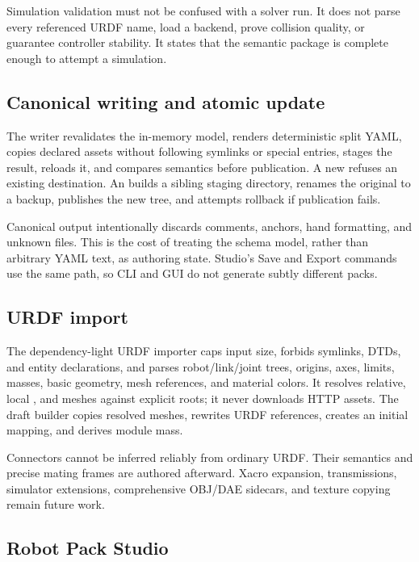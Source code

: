 Simulation validation must not be confused with a solver run. It does not parse every
referenced URDF name, load a backend, prove collision quality, or guarantee controller
stability. It states that the semantic package is complete enough to attempt a
simulation.

\subsection{Canonical writing and atomic update}

The writer revalidates the in-memory model, renders deterministic split YAML, copies
declared assets without following symlinks or special entries, stages the result,
reloads it, and compares semantics before publication. A new  refuses an
existing destination. An  builds a sibling staging directory, renames the
original to a backup, publishes the new tree, and attempts rollback if publication
fails.

Canonical output intentionally discards comments, anchors, hand formatting, and unknown
files. This is the cost of treating the schema model, rather than arbitrary YAML text,
as authoring state. Studio's Save and Export commands use the same path, so CLI and GUI
do not generate subtly different packs.

\subsection{URDF import}

The dependency-light URDF importer caps input size, forbids symlinks, DTDs, and entity
declarations, and parses robot/link/joint trees, origins, axes, limits, masses, basic
geometry, mesh references, and material colors. It resolves relative, local
, and  meshes against explicit roots; it never downloads
HTTP assets. The draft builder copies resolved meshes, rewrites URDF references,
creates an initial mapping, and derives module mass.

Connectors cannot be inferred reliably from ordinary URDF. Their semantics and precise
mating frames are authored afterward. Xacro expansion, transmissions, simulator
extensions, comprehensive OBJ/DAE sidecars, and texture copying remain future work.

\subsection{Robot Pack Studio}


